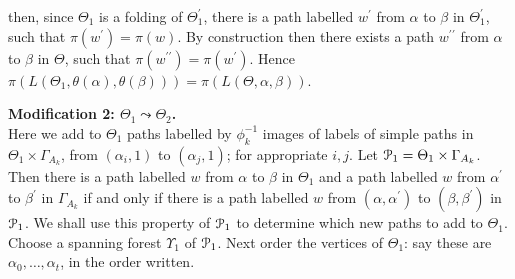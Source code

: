 \documentclass[a4paper,12pt]{article}
\renewcommand{\a}{\alpha }
\renewcommand{\b}{\beta }
\newcommand{\G}{\Gamma }
\newcommand{\T}{\Theta }
\newcommand{\U}{\Upsilon }
\newcommand{\cP}{{\cal{P}}}
\numberwithin{equation}{section}
\numberwithin{figure}{section}
\begin{document}
then, since $\Theta_1$ is a folding of $\Theta_1^\prime$,
 there is a path labelled $w^\prime$ from $\a$ to $\b$ in $\Theta_1^\prime$,
such that $\pi(w^\prime)=\pi(w)$. 
By construction then there exists  a path $w^{\prime\prime}$ from
$\a$ to $\b$ in $\Theta$, such that $\pi(w^{\prime\prime}) =
\pi(w^\prime)$. Hence $\pi(L(\Theta_1,\theta(\a),\theta(\b)))
= \pi(L(\Theta, \a,\b))$.  \\[1em]

\noindent\textbf{Modification 2: $\T_1\leadsto \T_2$.}\\
Here we add to $\T_1$ paths labelled by $\phi_k^{-1}$ images of labels of simple
paths in $\T_1\times \G_{A_k}$, from $(\a_i,1)$ to $(\a_j,1)$; for 
appropriate $i,j$. 
 Let $\cP_1=\T_1\times \G_{A_k}$. Then there is a path
 labelled $w$ from $\a$ to $\b$
in $\T_1$ and a path labelled $w$ from $\a^\prime $
to $\b^\prime$ in $\G_{A_k}$ if and only if there is a path
labelled $w$ from $(\a,\a^\prime)$ to $(\b,\b^\prime)$ in $\cP_1$.
 We shall
use this property of $\cP_1$ to determine which new paths to add  to
$\T_1$. Choose a spanning  forest $\U_1$ of  $\cP_1$. Next
 order the vertices of
$\T_1$: say these are $\a_0,\ldots, \a_t$, in the order written.
\end{document}
